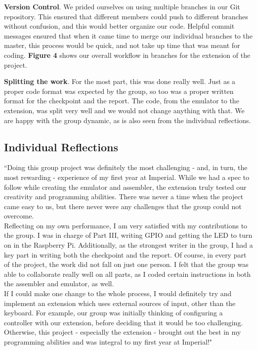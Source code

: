 \documentclass[11pt]{article}
\newenvironment{myquote}%
  {\list{}{\leftmargin=0.0in\rightmargin=0.0in}\item[]}%
  {\endlist}
\begin{document}
\vspace{0.2in}

\textbf{Version Control}. We prided ourselves on using multiple branches in our Git repository. This ensured that different members could push to different branches without confusion, and this would better organize our code. Helpful commit messages ensured that when it came time to merge our individual branches to the master, this process would be quick, and not take up time that was meant for coding. \textbf{Figure 4} shows our overall workflow in branches for the extension of the project.

\vspace{0.2in}

\textbf{Splitting the work}. For the most part, this was done really well. Just as a proper code format was expected by the group, so too was a proper written format for the checkpoint and the report. The code, from the emulator to the extension, was split very well and we would not change anything with that. We are happy with the group dynamic, as is also seen from the individual reflections.

\subsection{Individual Reflections}

\begin{myquote}
``Doing this group project was definitely the most challenging - and, in turn, the most rewarding - experience of my first year at Imperial. While we had a spec to follow while creating the emulator and assembler, the extension truly tested our creativity and programming abilities. There was never a time when the project came easy to us, but there never were any challenges that the group could not overcome.
\\Reflecting on my own performance, I am very satisfied with my contributions to the group. I was in charge of Part III, writing GPIO and getting the LED to turn on in the Raspberry Pi. Additionally, as the strongest writer in the group, I had a key part in writing both the checkpoint and the report. Of course, in every part of the project, the work did not fall on just one person. I felt that the group was able to collaborate really well on all parts, as I coded certain instructions in both the assembler and emulator, as well.
\\If I could make one change to the whole process, I would definitely try and implement an extension which uses external sources of input, other than the keyboard. For example, our group was initially thinking of configuring a controller with our extension, before deciding that it would be too challenging. Otherwise, this project - especially the extension - brought out the best in my programming abilities and was integral to my first year at Imperial!"
\end{myquote}
\end{document}
